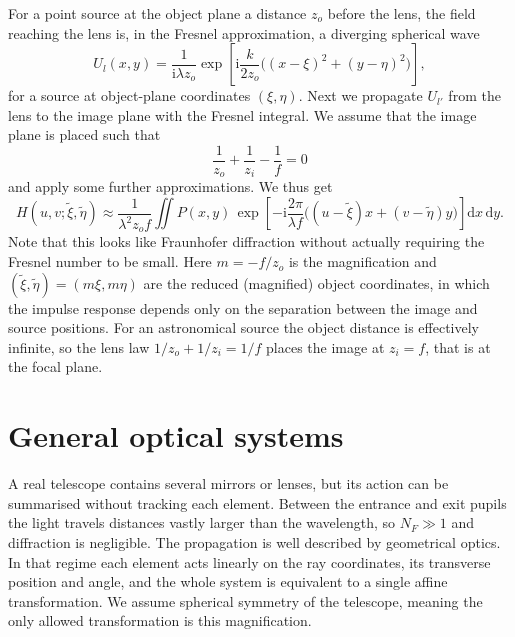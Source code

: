 \documentclass[11pt]{book}
\begin{document}
For a point source at the object plane a distance $z_o$ before the lens, the field reaching the lens is, in the Fresnel approximation, a diverging spherical wave
\begin{equation}
U_l(x,y) = \frac{1}{\mathrm{i}\lambda z_o}\exp\!\left[\mathrm{i}\frac{k}{2z_o}\big((x-\xi)^2+(y-\eta)^2\big)\right],
\end{equation}
for a source at object-plane coordinates $(\xi,\eta)$. Next we propagate $U_{l'}$ from the lens to the image plane with the Fresnel integral. We assume that the image plane is placed such that
\begin{equation}
	\frac{1}{z_o}+\frac{1}{z_i}-\frac{1}{f} = 0
\end{equation} 
	and apply some further approximations. We thus get
\begin{equation}
H(u,v;\tilde\xi,\tilde\eta)\approx \frac{1}{\lambda^2 z_o f}\iint P(x,y)\,
\exp\!\left[-\mathrm{i}\frac{2\pi}{\lambda f}\big((u-\tilde\xi)x + (v-\tilde\eta)y\big)\right]\mathrm{d}x\,\mathrm{d}y.
\label{eq:lensimpulse}
\end{equation}
Note that this looks like Fraunhofer diffraction without actually requiring the Fresnel number to be small. Here $m=-f/z_o$ is the magnification and $(\tilde\xi,\tilde\eta)=(m\xi,m\eta)$ are the reduced (magnified) object coordinates, in which the impulse response depends only on the separation between the image and source positions. For an astronomical source the object distance is effectively infinite, so the lens law $1/z_o + 1/z_i = 1/f$ places the image at $z_i = f$, that is at the focal plane.

\section{General optical systems}

A real telescope contains several mirrors or lenses, but its action can be summarised without tracking each element. Between the entrance and exit pupils the light travels distances vastly larger than the wavelength, so $N_F\gg 1$ and diffraction is negligible. The propagation is well described by geometrical optics. In that regime each element acts linearly on the ray coordinates, its transverse position and angle, and the whole system is equivalent to a single affine transformation. We assume spherical symmetry of the telescope, meaning the only allowed transformation is this magnification.
\end{document}
